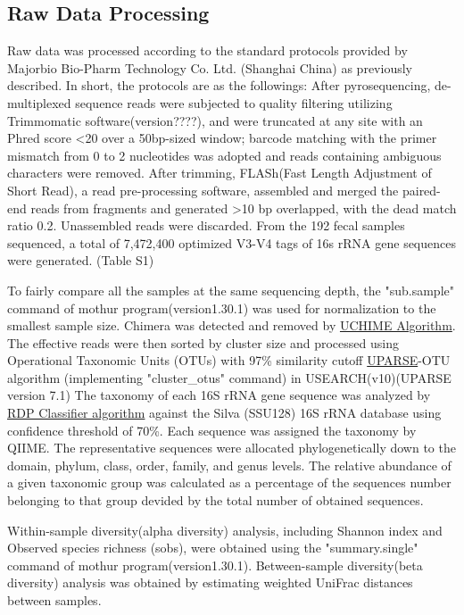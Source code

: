 \documentclass[fleqn,10pt]{wlpeerj} %
\begin{document}
  \subsection*{Raw Data Processing}
  Raw data was processed according to the standard protocols provided by Majorbio Bio-Pharm Technology Co. Ltd. (Shanghai China) as previously described\citep{liu2018splenectomy, wang2018bacterial}. In short, the protocols are as the followings:
  After pyrosequencing, de-multiplexed sequence reads were subjected to quality filtering utilizing Trimmomatic software(version????)\citep{bolger2014trimmomatic},  and were truncated at any site with an Phred score \textless 20 over a 50bp-sized window; barcode matching with the primer mismatch from 0 to 2 nucleotides was adopted and reads containing ambiguous characters were removed. After trimming, FLASh(Fast Length Adjustment of Short Read)\citep{magovc2011flash}, a read pre-processing software, assembled and merged the paired-end reads from fragments and generated \textgreater 10 bp overlapped, with the dead match ratio 0.2. Unassembled reads were discarded. From the 192 fecal samples sequenced, a total of 7,472,400 optimized V3-V4 tags of 16s rRNA gene sequences were generated. (Table S1)

  \noindent
  To fairly compare all the samples at the same sequencing depth, the "sub.sample" command of mothur program(version1.30.1)\citep{schloss2009introducing} was used for normalization to the smallest sample size. Chimera was detected and removed by \href{https://www.drive5.com/usearch/manual/uchime_algo.html}{UCHIME Algorithm}. The effective reads were then sorted by cluster size and processed using Operational Taxonomic Units (OTUs) with 97\% similarity cutoff \href{http://drive5.com/uparse/}{UPARSE}-OTU algorithm (implementing "cluster\_otus" command)\citep{edgar2013uparse} in USEARCH(v10)(UPARSE version 7.1) The taxonomy of each 16S rRNA gene sequence was analyzed by \href{http://rdp.cme.msu.edu/}{RDP Classifier algorithm}\citep{wang2007naive} against the Silva (SSU128)\citep{quast2012silva} 16S rRNA database using confidence threshold of 70\%. Each sequence was assigned the taxonomy by QIIME\citep{caporaso2010qiime}. The representative sequences were allocated phylogenetically down to the domain, phylum, class, order, family, and genus levels. The relative abundance of a given taxonomic group was calculated as a percentage of the sequences number belonging to that group devided by the total number of obtained sequences.

  \noindent
   Within-sample diversity(alpha diversity) analysis, including Shannon index and Observed species richness (sobs), were obtained using the "summary.single" command of mothur program(version1.30.1)\citep{schloss2009introducing}. Between-sample diversity(beta diversity) analysis was obtained by estimating weighted UniFrac distances between samples.
\end{document}
